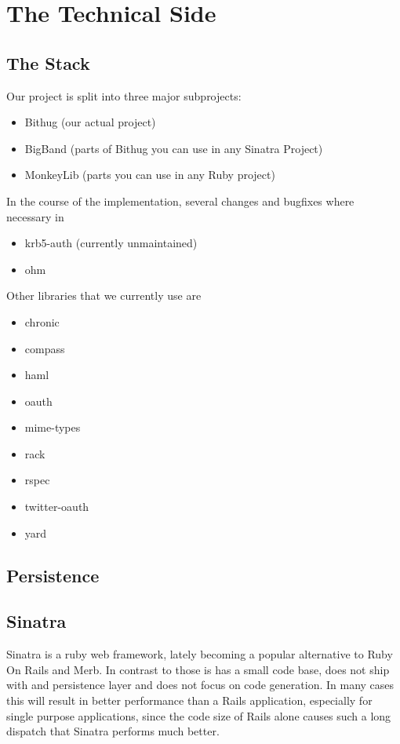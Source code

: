 \documentclass{llncs}
\begin{document}
\section{The Technical Side}

\subsection{The Stack}

Our project is split into three major subprojects:
\begin{itemize}
  \item Bithug (our actual project)
  \item BigBand (parts of Bithug you can use in any Sinatra Project)
  \item MonkeyLib (parts you can use in any Ruby project)
\end{itemize}

In the course of the implementation, several changes and bugfixes where
necessary in
\begin{itemize}
  \item krb5-auth (currently unmaintained) 
  \item ohm
\end{itemize}

Other libraries that we currently use are
\begin{itemize}
  \item chronic
  \item compass
  \item haml
  \item oauth
  \item mime-types
  \item rack
  \item rspec
  \item twitter-oauth
  \item yard
\end{itemize}

\subsection{Persistence}


\subsection{Sinatra}
Sinatra is a ruby web framework\cite{sinatra:www}, lately becoming a popular alternative to Ruby On Rails and Merb.
In contrast to those is has a small code base, does not ship with and persistence layer and does not focus on code
generation. In many cases this will result in better performance than a Rails application, especially for single
purpose applications, since the code size of Rails alone causes such a long dispatch that Sinatra performs much better.
\end{document}
